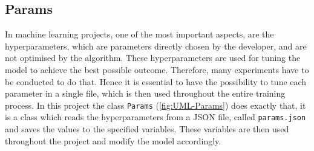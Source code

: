 \subsection{Params}
\label{sub:Params}
In machine learning projects, one of the most important aspects, are the hyperparameters, which are parameters directly chosen by the developer, and are not optimised by the algorithm. These hyperparameters are used for tuning the model to achieve the best possible outcome. Therefore, many experiments have to be conducted to do that. Hence it is essential to have the possibility to tune each parameter in a single file, which is then used throughout the entire training process. In this project the class \texttt{Params} (\ref{fig:UML-Params}) does exactly that, it is a class which reads the hyperparameters from a JSON file, called \texttt{params.json} and saves the values to the specified variables. These variables are then used throughout the project and modify the model accordingly.
\clearpage
